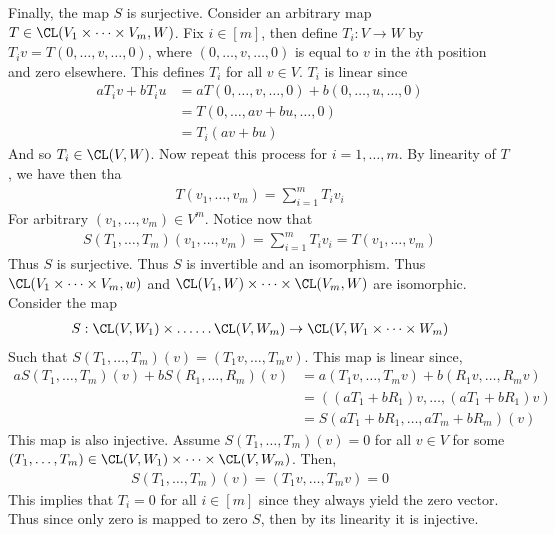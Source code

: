 \documentclass{book}
\begin{document}
\begin{enumerate}[label=\arabic*)]
      Finally, the map $S$ is surjective. Consider an arbitrary map $T \in \CL(V_1\times\dots\times V_m, W)$. Fix $i \in [m]$, then define $T_i: V \to W$ by $T_iv = T(0, \dots, v, \dots,
      0)$, where $(0, \dots, v, \dots, 0)$ is equal to $v$ in the $i$th position and zero elsewhere. This defines $T_i$ for all $v \in V$. $T_i$ is linear since 
      \begin{align*}
        aT_iv + bT_iu & = aT(0, \dots, v, \dots, 0) + b(0, \dots, u, \dots, 0) \\
        & = T(0, \dots, av + bu, \dots, 0) \\
        & = T_i(av + bu)
      \end{align*}
      And so $T_i \in \CL(V, W)$. Now repeat this process for $i = 1, \dots, m$. By linearity of $T$, we have then tha
      \begin{align*}
        T(v_1, \dots, v_m) = \sum_{i = 1}^{m}T_iv_i
      \end{align*}
      For arbitrary $(v_1, \dots, v_m) \in V^m$. Notice now that 
      \begin{align*}
        S(T_1, \dots, T_m)(v_1, \dots, v_m) = \sum_{i = 1}^{m}T_iv_i = T(v_1, \dots, v_m)
      \end{align*}
      Thus $S$ is surjective. Thus $S$ is invertible and an isomorphism. Thus $\CL(V_1\times\dots\times V_m, w)$ and $\CL(V_1,W)\times\dots\times\CL(V_m, W)$ are isomorphic.
    \ii
      Consider the map
      \begin{align*}
        S: \CL(V, W_1)\times\dots\dots\CL(V, W_m) \to \CL(V, W_1\times\dots\times W_m)
      \end{align*}
      Such that $S(T_1, \dots, T_m)(v) = (T_1v, \dots, T_mv)$. This map is linear since,
      \begin{align*}
        aS(T_1, \dots, T_m)(v) + bS(R_1, \dots, R_m)(v) & = a(T_1v, \dots, T_mv) + b(R_1v, \dots, R_mv) \\
        & = ( (aT_1 + bR_1)v, \dots, (aT_1 + bR_1)v) \\
        & = S(aT_1 + bR_1, \dots, aT_m + bR_m)(v)
      \end{align*}
      This map is also injective. Assume $S(T_1, \dots, T_m)(v) = 0$ for all $v \in V$ for some $(T_1, \dots, T_m) \in \CL(V, W_1)\times\dots\times\CL(V, W_m)$. Then,
      \begin{align*}
        S(T_1, \dots, T_m)(v) = (T_1v, \dots, T_mv) = 0
      \end{align*}
      This implies that $T_i = 0$ for all $i \in [m]$ since they always yield the zero vector. Thus since only zero is mapped to zero $S$, then by its linearity it is injective. 


\end{enumerate}
\end{document}

